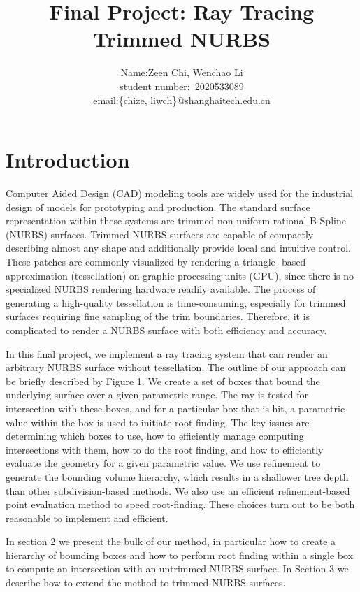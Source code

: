 \documentclass[acmtog]{acmart}
\title{Final Project: {Ray Tracing Trimmed NURBS}}
\author{Name:\quad Zeen Chi, Wenchao Li  \\ student number:\ 2020533089
\\email:\quad \{chize, liwch\}@shanghaitech.edu.cn}
\begin{document}
\maketitle

\vspace*{2 ex}

\section{Introduction}
\hspace*{8pt}
Computer Aided Design (CAD) modeling tools are widely used for the industrial design of models for prototyping and production. The standard surface representation within these systems are trimmed non-uniform rational B-Spline (NURBS) surfaces. Trimmed NURBS surfaces are capable of compactly describing almost any shape and additionally provide local and intuitive control. These patches are commonly visualized by rendering a triangle- based approximation (tessellation) on graphic processing units (GPU), since there is no specialized NURBS rendering hardware readily available. The process of generating a high-quality tessellation is time-consuming, especially for trimmed surfaces requiring fine sampling of the trim boundaries. Therefore, it is complicated to render a NURBS surface with both efficiency and accuracy.

In this final project, we implement a ray tracing system that can render an arbitrary NURBS surface without tessellation. The outline of our approach can be briefly described by Figure 1. We create a set of boxes that bound the underlying surface over a given parametric range. The ray is tested for intersection with these boxes, and for a particular box that is hit, a parametric value within the box is used to initiate root finding. The key issues are determining which boxes to use, how to efficiently manage computing intersections with them, how to do the root finding, and how to efficiently evaluate the geometry for a given parametric value.
We use refinement to generate the bounding volume hierarchy, which results in a shallower tree depth than other subdivision-based methods. We also use an efficient refinement-based point evaluation method to speed root-finding. These choices turn out to be both reasonable to implement and efficient.

In section 2 we present the bulk of our method, in particular how to create a hierarchy of bounding boxes and how to perform root finding within a single box to compute an intersection with an untrimmed NURBS surface. In Section 3 we describe how to extend the method to trimmed NURBS surfaces.
\end{document}
